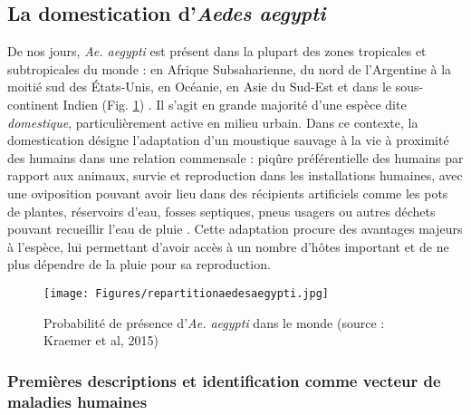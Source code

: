  
\subsection{La domestication d'{\em Aedes aegypti}}

De nos jours, {\em Ae. aegypti} est présent dans la plupart des zones tropicales et subtropicales du monde : en Afrique Subsaharienne, du nord de l'Argentine à la moitié sud des États-Unis, en Océanie, en Asie du Sud-Est et dans le sous-continent Indien (Fig. \ref{fig:repartitionaedesaegypti}) \cite{kraemer2015global}.
Il s'agit en grande majorité d'une espèce dite {\em domestique}, particulièrement active en milieu urbain.
Dans ce contexte, la domestication désigne l'adaptation d'un moustique sauvage à la vie à proximité des humains dans une relation commensale : piqûre préférentielle des humains par rapport aux animaux, survie et reproduction dans les installations humaines, avec une oviposition pouvant avoir lieu dans des récipients artificiels comme les pots de plantes, réservoirs d'eau, fosses septiques, pneus usagers ou autres déchets pouvant recueillir l'eau de pluie  \cite{christophers1960aedes}.
Cette adaptation procure des avantages majeurs à l'espèce, lui permettant d'avoir accès à un nombre  d'hôtes important et de ne plus dépendre de la pluie pour sa reproduction.


\begin{figure}[t]
	\centering
	\texttt{[image: Figures/repartitionaedesaegypti.jpg]}
	\caption{Probabilité de présence d'{\em Ae. aegypti} dans le monde (source : Kraemer et al, 2015)}
	\label{fig:repartitionaedesaegypti}
\end{figure}


\subsubsection{Premières descriptions et identification comme vecteur de maladies humaines}

